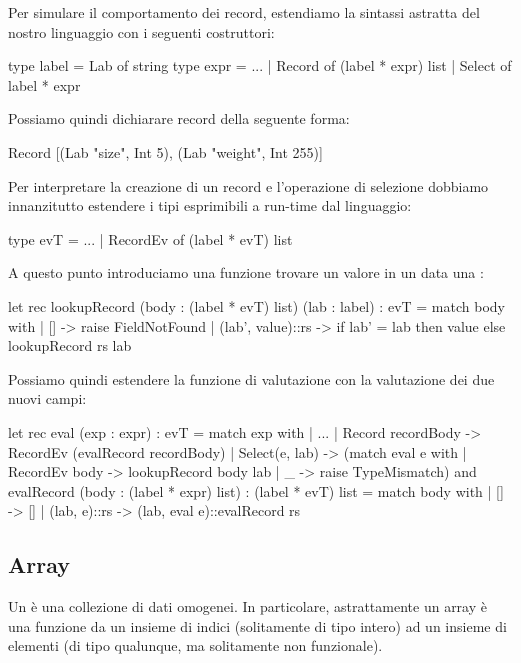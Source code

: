 Per simulare il comportamento dei record, estendiamo la sintassi astratta del nostro linguaggio con i seguenti costruttori:
\begin{OCaml}
    type label = Lab of string
    type expr = ...
        | Record of (label * expr) list
        | Select of label * expr
\end{OCaml}

Possiamo quindi dichiarare record della  seguente forma: \begin{OCaml}
    Record [(Lab "size", Int 5), (Lab "weight", Int 255)]
\end{OCaml}

Per interpretare la creazione di un record e l'operazione di selezione dobbiamo innanzitutto estendere i tipi esprimibili a run-time dal linguaggio:
\begin{OCaml}
    type evT = ...
        | RecordEv of (label * evT) list
\end{OCaml}
A questo punto introduciamo una funzione trovare un valore in un  data una :
\begin{OCaml}
    let rec lookupRecord (body : (label * evT) list) (lab : label) : evT =
        match body with
        | [] -> raise FieldNotFound
        | (lab', value)::rs -> if lab' = lab then value
                                else lookupRecord rs lab 
\end{OCaml}
Possiamo quindi estendere la funzione di valutazione con la valutazione dei due nuovi campi:
\begin{OCaml}
    let rec eval (exp : expr) : evT =
        match exp with
        | ...
        | Record recordBody -> RecordEv (evalRecord recordBody)
        | Select(e, lab) -> (match eval e with
                                | RecordEv body -> lookupRecord body lab
                                | _ -> raise TypeMismatch)
    and evalRecord (body : (label * expr) list) : (label * evT) list =
        match body with
        | [] -> []
        | (lab, e)::rs -> (lab, eval e)::evalRecord rs
\end{OCaml}

\subsection*{Array}

Un  è una collezione di dati omogenei. In particolare, astrattamente un array è una funzione da un insieme di indici (solitamente di tipo intero) ad un insieme di elementi (di tipo qualunque, ma solitamente non funzionale).

